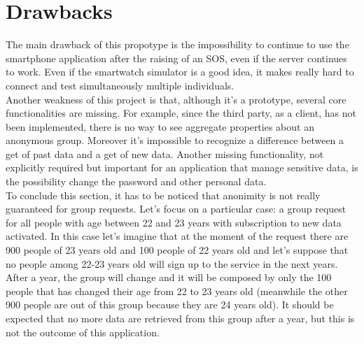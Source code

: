 \section{Drawbacks}
The main drawback of this propotype is the impossibility to continue to use the smartphone application after the raising of an SOS, even if the server continues to work. Even if the smartwatch simulator is a good idea, it makes really hard to connect and test simultaneously multiple individuals.\\
Another weakness of this project is that, although it's a prototype, several core functionalities are missing. For example, since the third party, as a client, has not been implemented, there is no way to see aggregate properties about an anonymous group. 
Moreover it's impossible to recognize a difference between a get of past data and a get of new data. Another missing functionality, not explicitly required but important for an application that manage sensitive data, is the possibility change the password and other personal data.\\
To conclude this section, it has to be noticed that anonimity is not really guaranteed for group requests. Let's focus on a particular case: a group request for all people with age between 22 and 23 years with subscription to new data activated. In this case let's imagine that at the moment of the request there are 900 people of 23 years old and 100 people of 22 years old and let's suppose that no people among 22-23 years old will sign up to the service in the next years. After a year, the group will change and it will be composed by only the 100 people that has changed their age from 22 to 23 years old (meanwhile the other 900 people are out of this group because they are 24 years old). It should be expected that no more data are retrieved from this group after a year, but this is not the outcome of this application.